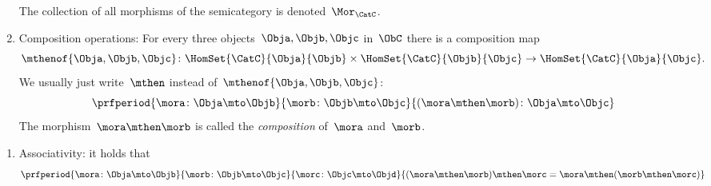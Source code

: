 \begin{ctdefinition}[Semicategory]
\begin{body}
\begin{enumerate}
                  The collection of all morphisms of the semicategory is denoted~$\Mor_\CatC$.
            \item Composition operations: For every three objects~$\Obja,\Objb,\Objc$ in~$\ObC$ there is a composition map
                  \begin{equation}
                      \mthenof{\Obja,\Objb,\Objc}\colon \HomSet{\CatC}{\Obja}{\Objb} \times \HomSet{\CatC}{\Objb}{\Objc}\to \HomSet{\CatC}{\Obja}{\Objc}.
                  \end{equation}
                  We usually just write~$\mthen$ instead of~$\mthenof{\Obja,\Objb,\Objc}$:
                  \begin{equation}
                      \prfperiod{
                          \mora \colon \Obja \mto \Objb
                      }{
                          \morb\colon \Objb \mto \Objc
                      }{
                          (\mora \mthen \morb )\colon \Obja \mto \Objc
                      }
                  \end{equation}
                  The morphism~$\mora \mthen \morb$ is called the \emph{composition} of~$\mora$ and~$\morb$.
        \end{enumerate}
        \condit
        \begin{enumerate}
            \item Associativity: it holds that
                  \begin{equation}
                      \prfperiod{
                          \mora\colon \Obja \mto \Objb
                      }{
                          \morb\colon \Objb \mto \Objc
                      }{
                          \morc\colon \Objc \mto \Objd
                      }{
                          (\mora\mthen \morb)
                          \mthen \morc= \mora \mthen (\morb \mthen \morc)
                      }
                  \end{equation}
        \end{enumerate}
    \end{body}
\end{ctdefinition}

